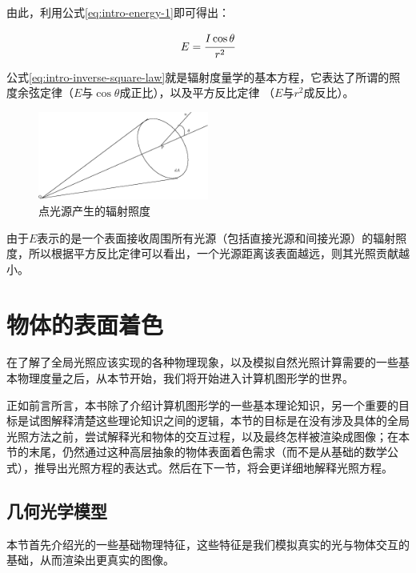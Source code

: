 \noindent 由此，利用公式\ref{eq:intro-energy-1}即可得出：

\begin{equation}\label{eq:intro-inverse-square-law}
	E= \cfrac{I\cos\theta}{r^{2}}
\end{equation}

\noindent 公式\ref{eq:intro-inverse-square-law}就是辐射度量学的基本方程，它表达了所谓的照度余弦定律（$E$与$\cos\theta$成正比），以及平方反比定律 （$E$与$r^{2}$成反比）。

\begin{figure}
\sidecaption
	\includegraphics[width=0.5\textwidth]{figures/intro/inverse-square-law}
	\caption{点光源产生的辐射照度}
	\label{f:intro-inverse-square-law}
\end{figure}

由于$E$表示的是一个表面接收周围所有光源（包括直接光源和间接光源）的辐射照度，所以根据平方反比定律可以看出，一个光源距离该表面越远，则其光照贡献越小。









\section{物体的表面着色}
在了解了全局光照应该实现的各种物理现象，以及模拟自然光照计算需要的一些基本物理度量之后，从本节开始，我们将开始进入计算机图形学的世界。

正如前言所言，本书除了介绍计算机图形学的一些基本理论知识，另一个重要的目标是试图解释清楚这些理论知识之间的逻辑，本节的目标是在没有涉及具体的全局光照方法之前，尝试解释光和物体的交互过程，以及最终怎样被渲染成图像；在本节的末尾，仍然通过这种高层抽象的物体表面着色需求（而不是从基础的数学公式），推导出光照方程的表达式。然后在下一节，将会更详细地解释光照方程。




\subsection{几何光学模型} 
本节首先介绍光的一些基础物理特征，这些特征是我们模拟真实的光与物体交互的基础，从而渲染出更真实的图像。

